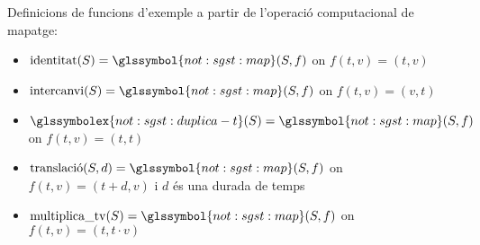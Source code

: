 \begin{example}
  Definicions de funcions d'exemple a partir de l'operació
  computacional de mapatge:

\begin{itemize}
\item $\operatorname{identitat}(S)= \glssymbol{not:sgst:map}(S,f)$ on
  $f(t,v)=(t,v)$
\item $\operatorname{intercanvi}(S)=
  \glssymbol{not:sgst:map}(S,f)$ on $f(t,v)=(v,t)$
\item $\glssymbolex{not:sgst:duplica-t}(S)=
  \glssymbol{not:sgst:map}(S,f)$ on $f(t,v)=(t,t)$
\item $\operatorname{translaci\acute{o}}(S,d)=
  \glssymbol{not:sgst:map}(S,f)$ on $f(t,v)=(t+d,v)$ i $d$ és una
  durada de temps
\item $\operatorname{multiplica\_tv}(S)=
  \glssymbol{not:sgst:map}(S,f)$ on $f(t,v)=(t,t\cdot v)$


\end{itemize}
\end{example}


